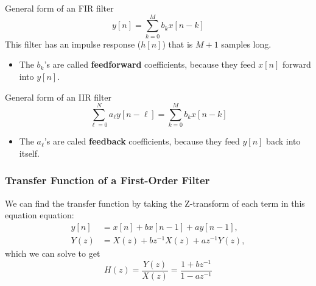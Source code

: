\documentclass{beamer}
\begin{document}
\begin{frame}
  \begin{block}{General form of an FIR filter}
    \[
    y[n] = \sum_{k=0}^{M} b_k x[n-k]
    \]
    This filter has an impulse response ($h[n]$) that is $M+1$ samples
    long.
    \begin{itemize}
    \item The $b_k$'s are called {\bf feedforward}
      coefficients, because they feed $x[n]$ forward into $y[n]$.
    \end{itemize}
  \end{block}
  \begin{block}{General form of an IIR filter}
    \[
    \sum_{\ell=0}^N a_\ell y[n-\ell] = \sum_{k=0}^{M} b_k x[n-k]
    \]
    \begin{itemize}
    \item %
      The $a_\ell$'s are caled
      {\bf feedback} coefficients, because they feed $y[n]$ back into
      itself.
    \end{itemize}
  \end{block}
\end{frame}

\begin{frame}
  \frametitle{Transfer Function of a First-Order Filter}

  We can find the transfer function by taking the Z-transform of each
  term in this equation equation:
  \begin{align*}
  y[n] &= x[n] + bx[n-1] + ay[n-1],\\
  Y(z) &= X(z)+bz^{-1}X(z) + az^{-1} Y(z),
  \end{align*}
  which we can solve to get
  \[
  H(z)  = \frac{Y(z)}{X(z)} = \frac{1+bz^{-1}}{1-az^{-1}}
  \]
\end{frame}
\end{document}
